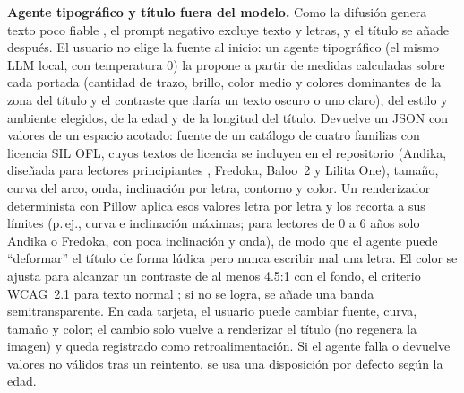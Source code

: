 \documentclass[10pt,a4paper,twocolumn]{article}
\begin{document}
\textbf{Agente tipográfico y título fuera del modelo.} Como la difusión genera texto poco fiable \citep{chen2023textdiffuser}, el prompt negativo excluye texto y letras, y el título se añade después. El usuario no elige la fuente al inicio: un agente tipográfico (el mismo LLM local, con temperatura 0) la propone a partir de medidas calculadas sobre cada portada (cantidad de trazo, brillo, color medio y colores dominantes de la zona del título y el contraste que daría un texto oscuro o uno claro), del estilo y ambiente elegidos, de la edad y de la longitud del título. Devuelve un JSON con valores de un espacio acotado: fuente de un catálogo de cuatro familias con licencia SIL OFL, cuyos textos de licencia se incluyen en el repositorio (Andika, diseñada para lectores principiantes \citep{andika}, Fredoka, Baloo~2 y Lilita One), tamaño, curva del arco, onda, inclinación por letra, contorno y color. Un renderizador determinista con Pillow aplica esos valores letra por letra y los recorta a sus límites (p.\,ej., curva e inclinación máximas; para lectores de 0 a 6 años solo Andika o Fredoka, con poca inclinación y onda), de modo que el agente puede ``deformar'' el título de forma lúdica pero nunca escribir mal una letra. El color se ajusta para alcanzar un contraste de al menos 4.5:1 con el fondo, el criterio WCAG~2.1 para texto normal \citep{wcag21}; si no se logra, se añade una banda semitransparente. En cada tarjeta, el usuario puede cambiar fuente, curva, tamaño y color; el cambio solo vuelve a renderizar el título (no regenera la imagen) y queda registrado como retroalimentación. Si el agente falla o devuelve valores no válidos tras un reintento, se usa una disposición por defecto según la edad.
\end{document}
